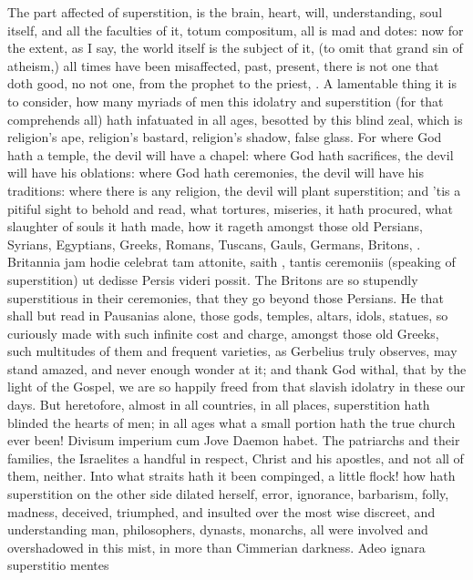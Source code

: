 {The part affected of superstition, is the brain, heart, will,
understanding, soul itself, and all the faculties of it, totum
compositum, all is mad and dotes: now for the extent, as I say, the
world itself is the subject of it, (to omit that grand sin of atheism,)
all times have been misaffected, past, present, there is not one that
doth good, no not one, from the prophet to the priest, \etc{}. A lamentable
thing it is to consider, how many myriads of men this idolatry and
superstition (for that comprehends all) hath infatuated in all ages,
besotted by this blind zeal, which is religion's ape, religion's
bastard, religion's shadow, false glass. For where God hath a temple,
the devil will have a chapel: where God hath sacrifices, the devil will
have his oblations: where God hath ceremonies, the devil will have his
traditions: where there is any religion, the devil will plant
superstition; and 'tis a pitiful sight to behold and read, what
tortures, miseries, it hath procured, what slaughter of souls it hath
made, how it rageth amongst those old Persians, Syrians, Egyptians,
Greeks, Romans, Tuscans, Gauls, Germans, Britons, \etc{}. Britannia jam
hodie celebrat tam attonite, saith \Pliny{}, tantis ceremoniis
(speaking of superstition) ut dedisse Persis videri possit. The Britons
are so stupendly superstitious in their ceremonies, that they go beyond
those Persians. He that shall but read in Pausanias alone, those gods,
temples, altars, idols, statues, so curiously made with such infinite
cost and charge, amongst those old Greeks, such multitudes of them and
frequent varieties, as Gerbelius truly observes, may stand
amazed, and never enough wonder at it; and thank God withal, that by
the light of the Gospel, we are so happily freed from that slavish
idolatry in these our days. But heretofore, almost in all countries, in
all places, superstition hath blinded the hearts of men; in all ages
what a small portion hath the true church ever been! Divisum imperium
cum Jove Daemon habet. The patriarchs and their families, the
Israelites a handful in respect, Christ and his apostles, and not all
of them, neither. Into what straits hath it been compinged, a little
flock! how hath superstition on the other side dilated herself, error,
ignorance, barbarism, folly, madness, deceived, triumphed, and insulted
over the most wise discreet, and understanding man, philosophers,
dynasts, monarchs, all were involved and overshadowed in this mist, in
more than Cimmerian darkness. Adeo ignara superstitio mentes
}
